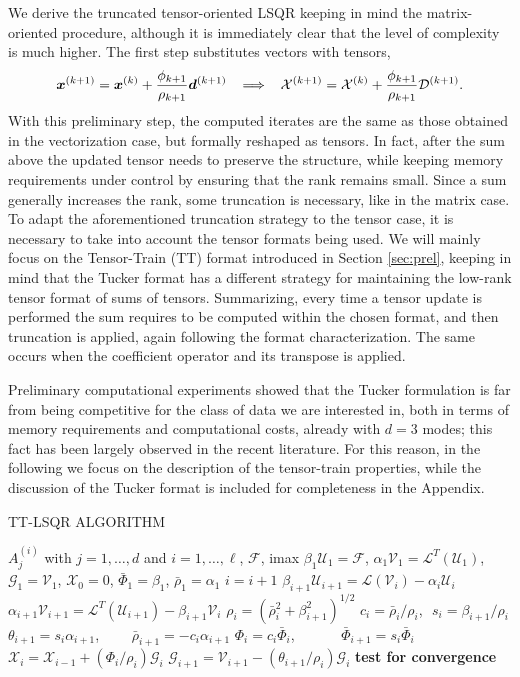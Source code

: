 \documentclass{siamart190516}
\newcommand{\cc}[1]{\mathcal{#1}}
\newcommand{\cX}{\cc X}
\newcommand{\cF}{\cc F}
\newcommand{\cU}{\cc U}
\newcommand{\cV}{\cc V}
\begin{document}
We derive the truncated tensor-oriented LSQR keeping in mind the matrix-oriented procedure, although it is immediately clear that the level of complexity is much higher. The first step substitutes vectors with tensors,
\[
    {\bm x}^{(k+1)}={\bm x}^{(k)}+\frac{\phi_{k+1}}{\rho_{k+1}} {\bm d}^{(k+1)} \hspace{.3cm}\Longrightarrow\hspace{.3cm} \cc{X}^{(k+1)} = \cc{X}^{(k)} + \frac{\phi_{k+1}}{\rho_{k+1}} \cc{D}^{(k+1)}.
\]
With this preliminary step, the computed iterates are the same as those obtained in the vectorization case, but formally reshaped as tensors.
In fact, after the sum above the updated tensor needs to
 preserve the structure, while keeping memory
 requirements under control by ensuring that the rank remains small. Since a sum generally increases the rank, some truncation is necessary, like in the matrix case. 
 To adapt the aforementioned truncation strategy to the tensor case, it is necessary to take
 into account the tensor formats being used. We will mainly focus on the
 Tensor-Train (TT) format introduced in Section \ref{sec:prel}, keeping in mind that 
 the Tucker format has a different strategy for maintaining the low-rank tensor format of sums of tensors. 
 Summarizing, every time a tensor update is
 performed the sum requires to be computed
 within the chosen format, and then truncation
 is applied, again following the 
 format characterization. The same occurs
 when the coefficient operator and its 
 transpose is applied. 

 Preliminary computational experiments showed that the
Tucker formulation is far from being competitive for the class
of data we are interested in, both in terms of memory requirements and computational costs, already with
$d=3$ modes; this fact has been largely observed in the
recent literature. For this reason, in the
following we focus on the description of the tensor-train
properties, while the discussion of the Tucker format
is included for completeness in the Appendix.
 


\begin{algorithm}[htb]
\caption{TT-LSQR ALGORITHM}\label{tensor:lsqr}
\begin{algorithmic}
\REQUIRE $A^{(i)}_j$ with $j=1,\ldots,d$ and $i = 1,\ldots, \ell$, $\cF$, imax
\STATE $\beta_1 \cU_1=\cF$, $\alpha_1\cV_1=\cc{L}^T(\cU_1)$, $\cc{G}_1=\cV_1$, $\cc{X}_0=\cc{0}$, $\bar{\Phi}_1=\beta_1$, $\bar{\rho}_1=\alpha_1$
\STATE $i=i+1$
\STATE $\beta_{i+1}\cU_{i+1}=\cc{L}(\cV_i)-\alpha_i\cU_i$
\STATE $\alpha_{i+1}\cV_{i+1}=\cc{L}^T(\cU_{i+1})-\beta_{i+1}\cV_{i}$
\STATE $\rho_i=(\bar{\rho}_i^2+\beta_{i+1}^2)^{1/2}$
\STATE $c_i=\bar{\rho}_i/\rho_i$, $\, \, s_i=\beta_{i+1}/\rho_i$
\STATE $\theta_{i+1}=s_i\alpha_{i+1}$,  $\qquad\bar{\rho}_{i+1}=-c_i\alpha_{i+1}$
\STATE $\Phi_i=c_i\bar{\Phi}_i$,
$\qquad\quad \bar{\Phi}_{i+1}=s_i\bar{\Phi}_i$
\STATE $\cc{X}_i=\cX_{i-1}+(\Phi_i/\rho_i)\cc{G}_i$
\STATE $\cc{G}_{i+1}=\cV_{i+1}-(\theta_{i+1}/\rho_i)\cc{G}_i$
\STATE \textbf{test for convergence}
\ENDWHILE
\end{algorithmic}
\end{algorithm}
\end{document}
